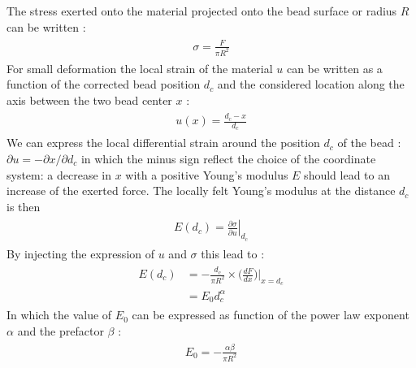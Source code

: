 \documentclass[A4paperpaper,11pt,english]{sphinxmanual}
\begin{document}
The stress exerted onto the material projected onto the bead surface or radius
\(R\) can be written :
\label{index-latex:equation-eqa32}\begin{gather}
\begin{split}\sigma = \frac{F}{\pi R^2}\end{split}\label{index-latex-eqa32}
\end{gather}
For small deformation the local strain of the material \(u\) can be written
as a function of the corrected bead position \(d_c\) and the considered location
along the axis between the two bead center \(x\) :
\label{index-latex:equation-eqa33}\begin{gather}
\begin{split}u(x)= \frac{d_c-x}{d_c}\end{split}\label{index-latex-eqa33}
\end{gather}
We can express the local differential strain around the position \(d_c\) of the
bead : \(\partial u = -\partial x/ \partial d_c\) in which the minus sign
reflect the choice of the coordinate system: a decrease in \(x\) with a
positive Young's modulus \(E\) should lead to an increase of the exerted force.
The locally felt Young's modulus
at the distance \(d_c\) is then
\label{index-latex:eq-e}\label{index-latex:equation-eqa34}\begin{gather}
\begin{split}E(d_c) = \left.\frac{\partial\sigma}{\partial u}\right|_{d_c}\end{split}\label{index-latex-eqa34}
\end{gather}
By injecting the expression of \(u\) and \(\sigma\) this lead to :
\label{index-latex:equation-eqa35}\begin{gather}
\begin{split}E(d_c) &= -\frac{d_c}{\pi R^2}\times \Big(\frac{dF}{dx}\Big) \Big|_{x=d_c}\\
     &= E_0 d_c^\alpha\end{split}\label{index-latex-eqa35}
\end{gather}
In which the value of \(E_0\) can be expressed as function of the power law exponent \(\alpha\) and the prefactor \(\beta\) :
\label{index-latex:equation-eqa36}\begin{gather}
\begin{split}E_0 = - \frac{\alpha\beta}{\pi R^2}\end{split}\label{index-latex-eqa36}
\end{gather}
\end{document}
